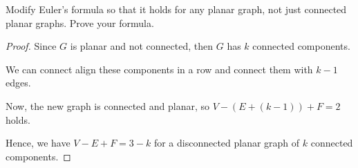 \documentclass[../hw7]{subfiles}
\begin{document}
\begin{problem}
Modify Euler's formula so that it holds for any planar graph, not just connected planar graphs. Prove your formula.
\end{problem}
\begin{proof}
	Since $G$ is planar and not connected, then $G$ has $k$ connected components.

	We can connect align these components in a row and connect them with $k-1$ edges.

	Now, the new graph is connected and planar, so $V-(E+(k-1))+F=2$ holds.

	Hence, we have $V-E+F=3-k$ for a disconnected planar graph of  $k$ connected components.
\end{proof}
\end{document}
